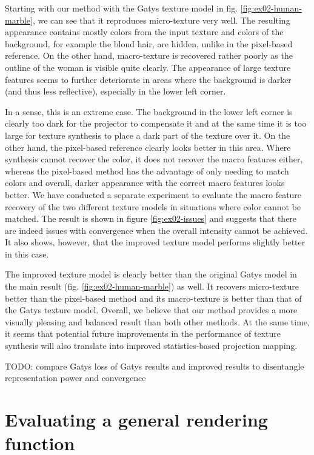 Starting with our method with the Gatys texture model in fig. \ref{fig:ex02-human-marble}, we can see that it reproduces micro-texture very well. The resulting appearance contains mostly colors from the input texture and colors of the background, for example the blond hair, are hidden, unlike in the pixel-based reference. On the other hand, macro-texture is recovered rather poorly as the outline of the woman is visible quite clearly. The appearance of large texture features seems to further deteriorate in areas where the background is darker (and thus less reflective), especially in the lower left corner.

In a sense, this is an extreme case. The background in the lower left corner is clearly too dark for the projector to compensate it and at the same time it is too large for texture synthesis to place a dark part of the texture over it. On the other hand, the pixel-based reference clearly looks better in this area. Where synthesis cannot recover the color, it does not recover the macro features either, whereas the pixel-based method has the advantage of only needing to match colors and overall, darker appearance with the correct macro features looks better. We have conducted a separate experiment to evaluate the macro feature recovery of the two different texture models in situations where color cannot be matched. The result is shown in figure \ref{fig:ex02-issues} and suggests that there are indeed issues with convergence when the overall intensity cannot be achieved. It also shows, however, that the improved texture model performs slightly better in this case.

The improved texture model is clearly better than the original Gatys model in the main result (fig. \ref{fig:ex02-human-marble}) as well. It recovers micro-texture better than the pixel-based method and its macro-texture is better than that of the Gatys texture model. Overall, we believe that our method provides a more visually pleasing and balanced result than both other methods. At the same time, it seems that potential future improvements in the performance of texture synthesis will also translate into improved statistics-based projection mapping.

{\color{red} TODO: compare Gatys loss of Gatys results and improved results to disentangle representation power and convergence}

\section{Evaluating a general rendering function}
\label{section:results-experiments-03}

